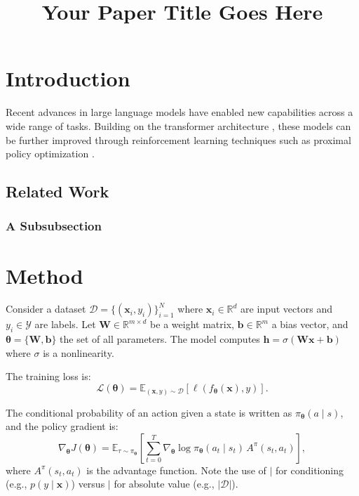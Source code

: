 \documentclass[10pt]{article}
\title{Your Paper Title Goes Here}
\affiliation{1}{University of California, Los Angeles}
\affiliation{2}{Another University}
\begin{document}
\maketitle

\section{Introduction}

Recent advances in large language models \citep{brown2020language} have enabled new capabilities across a wide range of tasks. Building on the transformer architecture \citep{vaswani2017attention}, these models can be further improved through reinforcement learning techniques such as proximal policy optimization \citep{schulman2017proximal}.

\lipsum[1]

\subsection{Related Work}

\lipsum[3]

\subsubsection{A Subsubsection}

\lipsum[4]

\section{Method}

Consider a dataset $\mathcal{D} = \{(\bm{x}_i, y_i)\}_{i=1}^{N}$ where $\bm{x}_i \in \mathbb{R}^d$ are input vectors and $y_i \in \mathcal{Y}$ are labels. Let $\bm{W} \in \mathbb{R}^{m \times d}$ be a weight matrix, $\bm{b} \in \mathbb{R}^m$ a bias vector, and $\bm{\theta} = \{\bm{W}, \bm{b}\}$ the set of all parameters. The model computes $\bm{h} = \sigma(\bm{W}\bm{x} + \bm{b})$ where $\sigma$ is a nonlinearity.

The training loss is:
\begin{equation}
    \mathcal{L}(\bm{\theta}) = \mathbb{E}_{(\bm{x}, y) \sim \mathcal{D}} \left[ \ell(f_{\bm{\theta}}(\bm{x}), y) \right].
    \label{eq:loss}
\end{equation}

The conditional probability of an action given a state is written as $\pi_{\bm{\theta}}(a \mid s)$, and the policy gradient is:
\begin{equation}
    \nabla_{\bm{\theta}} J(\bm{\theta}) = \mathbb{E}_{\tau \sim \pi_{\bm{\theta}}} \left[ \sum_{t=0}^{T} \nabla_{\bm{\theta}} \log \pi_{\bm{\theta}}(a_t \mid s_t) \, A^{\pi}(s_t, a_t) \right],
    \label{eq:pg}
\end{equation}
where $A^{\pi}(s_t, a_t)$ is the advantage function. Note the use of $\mid$ for conditioning (e.g., $p(y \mid \bm{x})$) versus $|$ for absolute value (e.g., $|\mathcal{D}|$).
\end{document}
